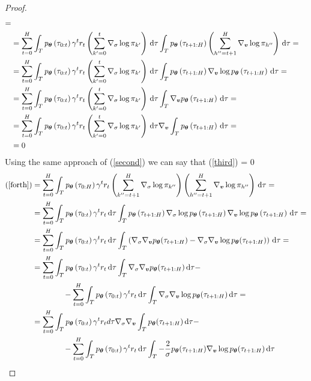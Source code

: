 \begin{proof}
\begin{align*}
=\\ &=
\sum_{t=0}^{H}\int_{T}p_{{\boldsymbol{\theta}}}\left(\tau_{0:t}\right)\gamma^{t}r_{t}\left(\sum_{k'=0}^{t}\nabla_{\sigma}\log\pi_{k'}\right)\, \textrm{d}\tau\int_{T}p_{{\boldsymbol{\theta}}}\left(\tau_{t+1:H}\right)\left(\sum_{h''=t+1}^{H}\nabla_{\boldsymbol{v}}\log\pi_{h''}\right)\, \textrm{d}\tau 
=\\ &=
\sum_{t=0}^{H}\int_{T}p_{{\boldsymbol{\theta}}}\left(\tau_{0:t}\right)\gamma^{t}r_{t}\left(\sum_{k'=0}^{t}\nabla_{\sigma}\log\pi_{k'}\right)\, \textrm{d}\tau\int_{T}p_{{\boldsymbol{\theta}}}\left(\tau_{t+1:H}\right)\nabla_{\boldsymbol{v}}\log p_{{\boldsymbol{\theta}}}\left(\tau_{t+1:H}\right)\, \textrm{d}\tau
=\\ &=
\sum_{t=0}^{H}\int_{T}p_{{\boldsymbol{\theta}}}\left(\tau_{0:t}\right)\gamma^{t}r_{t}\left(\sum_{k'=0}^{t}\nabla_{\sigma}\log\pi_{k'}\right)\, \textrm{d}\tau\int_{T}\nabla_{\boldsymbol{v}} p_{{\boldsymbol{\theta}}}\left(\tau_{t+1:H}\right)\, \textrm{d}\tau
=\\ &=
\sum_{t=0}^{H}\int_{T}p_{{\boldsymbol{\theta}}}\left(\tau_{0:t}\right)\gamma^{t}r_{t}\left(\sum_{k'=0}^{t}\nabla_{\sigma}\log\pi_{k'}\right)\, \textrm{d}\tau\nabla_{\boldsymbol{v}}\int_{T} p_{{\boldsymbol{\theta}}}\left(\tau_{t+1:H}\right)\, \textrm{d}\tau
=\\ &= 0
\end{align*}
\allowdisplaybreaks[0]
Using the same approach of (\ref{second}) we can say that (\ref{third}) = 0
\allowdisplaybreaks
\begin{align*}
(\ref{forth})
&=
\sum_{t=0}^{H}\int_{T}p_{\vtheta}\left(\tau_{0:H}\right)\gamma^{t}r_{t}\left(\gradlogsumpi{k''}{t+1}{H}{\sigma} \right)\left(\gradlogsumpi{h''}{t+1}{H}{\vv} \right)\de\tau
= \\ &=
\sum_{t=0}^{H}\int_{T}p_{\vtheta}\left(\tau_{0:t}\right)\gamma^{t}r_{t}\de\tau\int_{T}p_{\vtheta}\left(\tau_{t+1:H}\right)\nabla_{\sigma}\log p_{\vtheta}\left(\tau_{t+1:H}\right)\nabla_{\vv}\log p_{\vtheta}\left(\tau_{t+1:H}\right)\de\tau
= \\ &=
\sum_{t=0}^{H}\int_{T}p_{\vtheta}\left(\tau_{0:t}\right)\gamma^{t}r_{t}\de\tau\int_{T}\left( \nabla_{\sigma}\nabla_{\vv}p_{\vtheta}(\tau_{t+1:H}) - \nabla_{\sigma}\nabla_{\vv}\log p_{\vtheta}(\tau_{t+1:H}) \right)\de\tau
= \\ &=
\sum_{t=0}^{H}\int_{T}p_{\vtheta}\left(\tau_{0:t}\right)\gamma^{t}r_{t}\de\tau\int_{T} \nabla_{\sigma}\nabla_{\vv}p_{\vtheta}(\tau_{t+1:H})\de\tau -\\&\qquad\qquad- \sum_{t=0}^{H}\int_{T}p_{\vtheta}\left(\tau_{0:t}\right)\gamma^{t}r_{t}\de\tau\int_{T}\nabla_{\sigma}\nabla_{\vv}\log p_{\vtheta}(\tau_{t+1:H}) \de\tau
= \\ &=
\sum_{t=0}^{H}\int_{T}p_{\vtheta}\left(\tau_{0:t}\right)\gamma^{t}r_{t}d\tau\nabla_{\sigma}\nabla_{\vv}\int_{T} p_{\vtheta}(\tau_{t+1:H})\de\tau -\\&\qquad\qquad -\sum_{t=0}^{H}\int_{T}p_{\vtheta}\left(\tau_{0:t}\right)\gamma^{t}r_{t}\de\tau\int_{T}-\frac{2}{\sigma}p_{\vtheta}(\tau_{t+1:H})\nabla_{\vv}\log p_{\vtheta}(\tau_{t+1:H}) \de\tau

\end{align*}
\end{proof}
